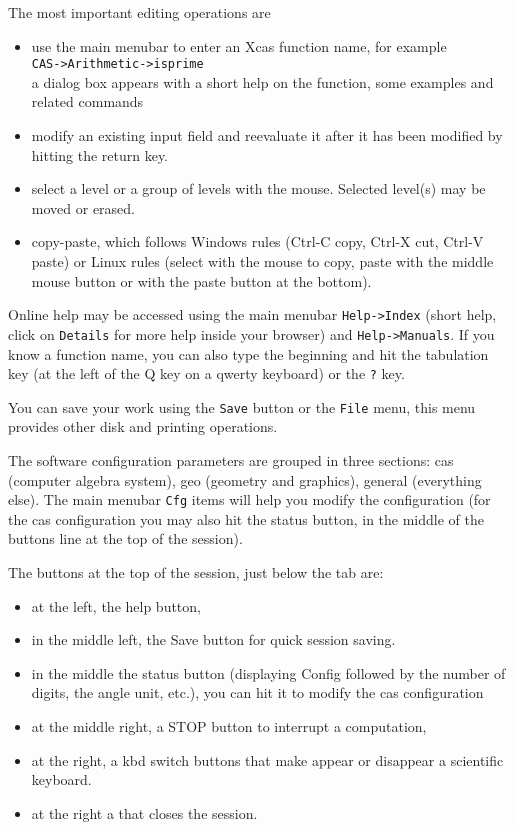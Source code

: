 \documentclass{article}
\begin{document}
The most important editing operations are
\begin{itemize}
\item
use the main menubar to enter an Xcas function name, for example\\
{\tt CAS->Arithmetic->isprime}\\
a dialog box appears
with a short help on the function, some examples and related
commands
\item modify an existing input field and reevaluate it after
it has been modified by hitting the return key.
\item
select a level or a group of levels with the mouse.
Selected level(s) may be moved or erased.
\item copy-paste, which follows Windows rules (Ctrl-C copy, Ctrl-X cut,
Ctrl-V paste) or Linux rules (select with the mouse to copy, paste with
the middle mouse button or with the paste button at the bottom).
\end{itemize}

Online help may be accessed using the main menubar {\tt Help->Index}
(short help, click on {\tt Details} for more help inside your browser) 
and {\tt Help->Manuals}. 
If you know a function name, you can also type the beginning and hit the
tabulation key (at the left of the Q key on a qwerty keyboard) or the
\verb|?| key.

You can save your work using the {\tt Save} button or the
{\tt File} menu, this menu provides
other disk and printing operations.

The software configuration parameters are grouped in three sections:
cas (computer algebra system), geo (geometry and graphics), general
(everything else). The main menubar {\tt Cfg} items will help
you modify the configuration (for the cas configuration you may
also hit the status button, in the middle of the buttons line at 
the top of the session).

The buttons at the top of the session, just below the tab are:
\begin{itemize}
\item at the left, the help button,
\item in the middle left, the Save button for quick session saving.
\item in the middle the status button 
(displaying Config followed by the number of digits,
the angle unit, etc.), you can hit it to modify
the cas configuration
\item at the middle right, a STOP button to interrupt a computation, 
\item at the right, a kbd switch buttons that make appear or disappear
a scientific keyboard.
\item at the right a  that closes the session.
\end{itemize}
\end{document}
